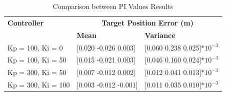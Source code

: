 \begin{table}[h]
    \centering
    \scriptsize %
    \caption{Comparison between PI Values Results}
    \begin{tabularx}{\linewidth}{|X|X|X|}
        \hline
        \textbf{Controller} & \multicolumn{2}{c|}{\textbf{Target Position Error (m)}} \\
        \cline{2-3}
        & \textbf{Mean} & \textbf{Variance} \\
        \hline
        Kp = 100, Ki = 0 & [0.020 -0.026 0.003] & [0.060 0.238 0.025]$*10^{-3}$ \\
        \hline
        Kp = 100, Ki = 50  & [0.015 -0.021 0.003] & [0.046 0.160 0.024]$*10^{-3}$  \\
        \hline
        Kp = 300, Ki = 50 & [0.007 -0.012 0.002] & [0.012 0.041 0.013]$*10^{-3}$  \\
        \hline
        Kp = 300, Ki = 100 & [0.003 -0.012 -0.001] & [0.011 0.035 0.010]$*10^{-3}$  \\
        \hline
    \end{tabularx}
\end{table}

